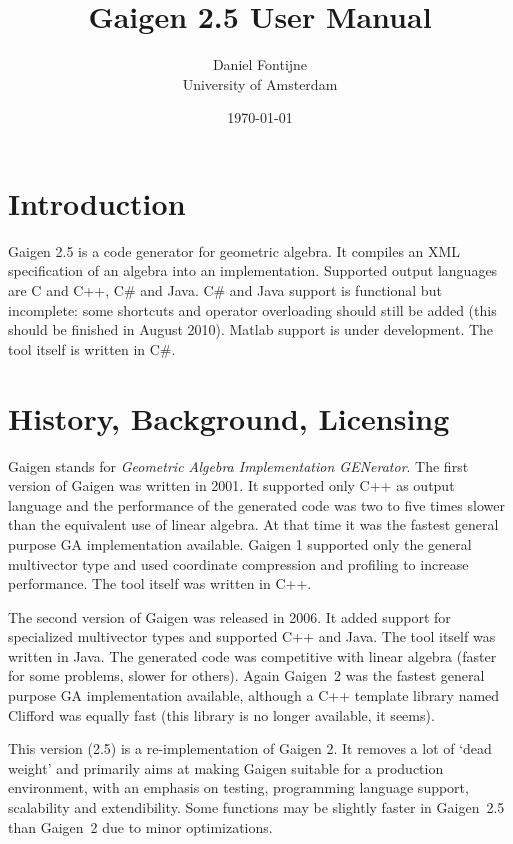 \documentclass[10pt, a4paper]{article}
\begin{document}
\title{Gaigen 2.5 User Manual}
\author{
Daniel Fontijne\\University of Amsterdam 
}
\date{\today}
\maketitle

\section{Introduction}

Gaigen 2.5 is a code generator for geometric algebra. It compiles an XML specification
of an algebra into an implementation. Supported output languages are C and C++,
C\# and Java. C\# and Java support is functional but incomplete: some shortcuts and operator
overloading should still be added (this should be finished in August 2010). 
Matlab support is under development. The tool itself is written in C\#.

\section{History, Background, Licensing}

Gaigen stands for \emph{Geometric Algebra Implementation GENerator}.
The first version of Gaigen was written in 2001. It supported only C++ as output language
and the performance of the generated code was two to five times slower than the equivalent
use of linear algebra. At that time it was the fastest general purpose GA implementation available. 
Gaigen 1 supported only the general multivector type and used coordinate  compression and profiling 
to increase performance. The tool itself was written in C++.

The second version of Gaigen was released in 2006. It added support for specialized multivector
types and supported C++ and Java. The tool itself was written in Java.
The generated code was competitive with linear algebra (faster for some problems, slower for others).
Again Gaigen~2 was the fastest general purpose GA implementation available, although a 
C++ template library named Clifford was equally fast (this library is no longer available,
it seems).

This version (2.5) is a re-implementation of Gaigen 2. It removes a lot of `dead weight' and
primarily aims at making Gaigen suitable for a production environment, with an emphasis on
testing, programming language support, scalability and extendibility. Some functions may be
slightly faster in Gaigen~2.5 than Gaigen~2 due to minor optimizations.
\end{document}
